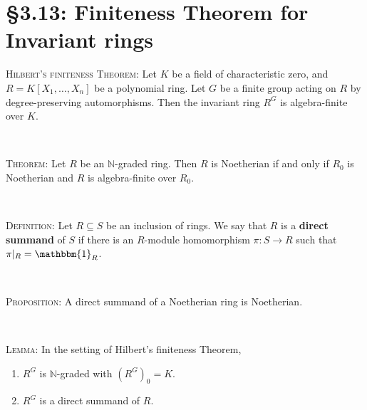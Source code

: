 \documentclass[12pt]{amsart}
\newcommand{\N}{\mathbb{N}}
\newcommand{\1}{\mathbbm{1}}
\newcommand{\showsol}[1]{\def\displaysol{#1}}
\begin{document}
\showsol{1}
	
	\thispagestyle{empty}
	
	\section*{\S3.13: Finiteness Theorem for Invariant rings}	

\begin{framed}

\noindent \textsc{Hilbert's finiteness Theorem:} Let $K$ be a field of characteristic zero, and $R=K[X_1,\dots,X_n]$ be a polynomial ring. Let $G$ be a finite group acting on $R$ by degree-preserving automorphisms. Then the invariant ring $R^G$ is algebra-finite over $K$.

\

\noindent \textsc{Theorem:} Let $R$ be an $\N$-graded ring. Then $R$ is Noetherian if and only if $R_0$ is Noetherian and $R$ is algebra-finite over $R_0$.

\


\noindent \textsc{Definition:} Let $R\subseteq S$ be an inclusion of rings. We say that $R$ is a \textbf{direct summand} of $S$ if there is an $R$-module homomorphism $\pi:S\to R$ such that $\pi|_R=\1_R$.

\

\noindent \textsc{Proposition:} A direct summand of a Noetherian ring is Noetherian. 

\

\noindent \textsc{Lemma:} In the setting of Hilbert's finiteness Theorem,
\begin{enumerate}
\item $R^G$ is $\N$-graded with $(R^G)_0=K$.
\item $R^G$ is a direct summand of $R$.
\end{enumerate}
 \end{framed}
 
\end{document}
